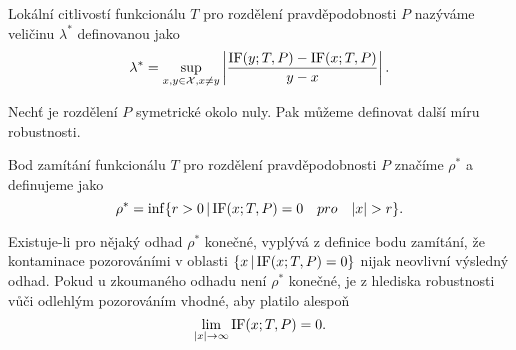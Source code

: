\begin{definition}
	Lokální citlivostí funkcionálu $T$ pro rozdělení pravděpodobnosti $P$ nazýváme veličinu $\lambda^*$ definovanou jako
	\begin{equation}
			\lambda^* = \sup_{x,y \in \mathcal{X},x \neq y}  \left| \frac{\mathrm{IF}({y};T,P) - \mathrm{IF}({x};T,P)}{y-x} \right|.
	\end{equation}
\end{definition}

\noindent Nechť je rozdělení $P$ symetrické okolo nuly. Pak můžeme definovat další míru robustnosti.

\begin{definition}
	Bod zamítání funkcionálu $T$ pro rozdělení pravděpodobnosti $P$ značíme $\rho^*$ a definujeme jako
	\begin{equation}
			\rho^* = \inf \lbrace r>0 \, | \, \mathrm{IF}({x};T,P) = 0 \quad pro \quad |x| > r\rbrace.
	\end{equation}
\end{definition}

\noindent Existuje-li pro nějaký odhad $\rho^*$ konečné, vyplývá z definice bodu zamítání, že kontaminace pozorováními v oblasti $\lbrace x \, | \, \mathrm{IF}({x};T,P) = 0 \rbrace$ nijak neovlivní výsledný odhad. Pokud u zkoumaného odhadu není $\rho^*$ konečné, je z hlediska robustnosti vůči odlehlým pozorováním vhodné, aby platilo alespoň
\begin{equation}
	\lim_{|x| \rightarrow \infty} \mathrm{IF}({x};T,P) = 0.
\end{equation}

